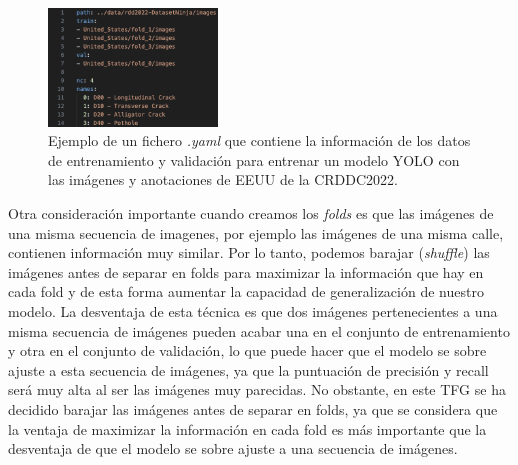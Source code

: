 \begin{figure}[H]
    \centering
    \includegraphics[width=0.4\textwidth]{img/yaml_example.png}
    \caption{Ejemplo de un fichero \textit{.yaml} que contiene la información de los datos de entrenamiento y validación para entrenar un modelo YOLO con las imágenes y anotaciones de EEUU de la CRDDC2022.}
    \label{fig:yaml_example}
\end{figure}

Otra consideración importante cuando creamos los \textit{folds} es que las imágenes de una misma secuencia de imagenes, por ejemplo las imágenes de una misma calle, contienen información muy similar. Por lo tanto, podemos barajar (\textit{shuffle}) las imágenes antes de separar en folds para maximizar la información que hay en cada fold y de esta forma aumentar la capacidad de generalización de nuestro modelo. La desventaja de esta técnica es que dos imágenes pertenecientes a una misma secuencia de imágenes pueden acabar una en el conjunto de entrenamiento y otra en el conjunto de validación, lo que puede hacer que el modelo se sobre ajuste a esta secuencia de imágenes, ya que la puntuación de precisión y recall será muy alta al ser las imágenes muy parecidas. No obstante, en este TFG se ha decidido barajar las imágenes antes de separar en folds, ya que se considera que la ventaja de maximizar la información en cada fold es más importante que la desventaja de que el modelo se sobre ajuste a una secuencia de imágenes.